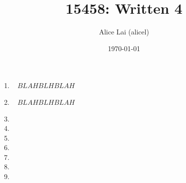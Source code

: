 \documentclass{article}
\title{15458: Written 4}
\author{Alice Lai (alicel)}
\date{\today}
\newcommand{\todo}[1]{%
  \colorbox{red!50}{$\displaystyle#1$}}
\begin{document}
\maketitle

\begin{enumerate}
  \item
      \
      \todo{BLAH BLH BLAH}
  \item
      \
      \todo{BLAH BLH BLAH}
  \item
  \item
  \item
  \item
  \item
  \item
  \item


\end{enumerate}
\end{document}
